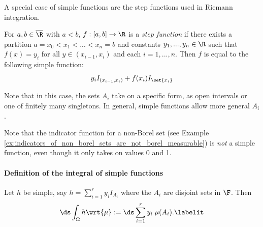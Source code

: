 \documentclass{article} %
\begin{document}
\begin{remark}{}
A special case of simple functions are the step functions used in Riemann integration. 


For $a,b \in \overline{\R}$ with $a<b$, $f : [a,b] \to \R$ is a \textit{step function} if there exists a partition $a = x_0 < x_1 < ... < x_n = b$ and constants $y_1, ..., y_n \in \R$ such that $f(x)=y_i$ for all $y \in (x_{i-1},x_i)$ and each $i=1,...,n$.  Then $f$ is equal to the following simple function:
\[ y_i I_{(x_{i-1}, x_i)} + f(x_i) I_{\set{x_i}}\]

Note that in this case, the sets $A_i$ take on a specific form, as open intervals or one of finitely many singletons.  In general, simple functions allow more general $A_i$. 

\label{rk:simple_functions_generalize_step_functions}
\end{remark}

\begin{remark}
Note that the indicator function for a non-Borel set (see Example \ref{ex:indicators_of_non_borel_sets_are_not_borel_measurable}) is \textit{not} a simple function, even though it only takes on values 0 and 1. 
\end{remark}

\paragraph{Definition of the integral of simple functions}

\begin{definition}
Let $h$ be simple, say $h = \sum_{i=1}^r y_i I_{A_i}$ where the $A_i$ are disjoint sets in $\F$.  Then
\begin{align*}
\ds\int_{\Omega} h \wrt{\mu} := \ds\sum_{i=1}^r y_i \; \mu(A_i).
\labelit \label{eqn:integral_of_simple_function}	
\end{align*}
 \label{def:integral_of_simple_function}
\end{definition}
\end{document}

